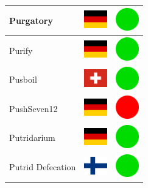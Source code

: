 \documentclass[12pt, a4paper, twoside]{report}
\begin{document}
\begin{center}
\begin{longtable}{|p{5cm}|p{2cm}|p{2cm}|}
 Purgatory                                                  & \includegraphics[width=1cm]{../img/flags/de} &   \includegraphics[width=1cm]{../likes/y} \\ \hline
 Purify                                                     & \includegraphics[width=1cm]{../img/flags/de} &   \includegraphics[width=1cm]{../likes/y} \\ \hline
 Pusboil                                                    & \includegraphics[width=1cm]{../img/flags/ch} &   \includegraphics[width=1cm]{../likes/y} \\ \hline
 PushSeven12                                                & \includegraphics[width=1cm]{../img/flags/de} &   \includegraphics[width=1cm]{../likes/n} \\ \hline
 Putridarium                                                & \includegraphics[width=1cm]{../img/flags/de} &   \includegraphics[width=1cm]{../likes/y} \\ \hline
 Putrid Defecation                                          & \includegraphics[width=1cm]{../img/flags/fi} &   \includegraphics[width=1cm]{../likes/y} \\ \hline

\end{longtable}
\end{center}
\end{document}
